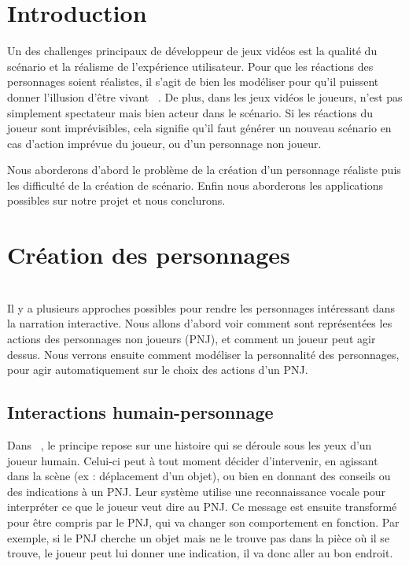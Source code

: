 \documentclass[asi]{picINSA}
\begin{document}
    
    \couverture{}

\tableofcontents{}

\chapter*{Introduction}

Un des challenges principaux de développeur de jeux vidéos est la qualité du scénario et la réalisme de l'expérience utilisateur.
Pour que les réactions des personnages soient réalistes, il s'agit de bien les modéliser pour
qu'il puissent donner l'illusion d'être vivant ~\cite{Bates94therole}. De plus, dans les jeux vidéos le joueurs,
n'est pas simplement spectateur mais bien acteur dans le scénario. Si les réactions du joueur sont imprévisibles,
cela signifie qu'il faut générer un nouveau scénario en cas d'action imprévue du joueur, ou d'un personnage non joueur.

Nous aborderons d'abord le problème de la création d'un personnage réaliste puis les difficulté de la création de scénario.
Enfin nous aborderons les applications possibles sur notre projet et nous conclurons.

\chapter{Création des personnages}
~\\
Il y a plusieurs approches possibles pour rendre les personnages intéressant dans la narration interactive. Nous allons d'abord voir comment sont représentées les actions des personnages non joueurs (PNJ), et comment un joueur peut agir dessus. Nous verrons ensuite comment modéliser la personnalité des personnages, pour agir automatiquement sur le choix des actions d'un PNJ.\\


\section{Interactions humain-personnage}

Dans ~\cite{IRIS:conf/aamas/CavazzaCM2002}, le principe repose sur une histoire qui se déroule sous les yeux d'un joueur humain. Celui-ci peut à tout moment décider d'intervenir, en agissant dans la scène (ex : déplacement d'un objet), ou bien en donnant des conseils ou des indications à un PNJ. Leur système utilise une reconnaissance vocale pour interpréter ce que le joueur veut dire au PNJ. Ce message est ensuite transformé pour être compris par le PNJ, qui va changer son comportement en fonction. Par exemple, si le PNJ cherche un objet mais ne le trouve pas dans la pièce où il se trouve, le joueur peut lui donner une indication, il va donc aller au bon endroit.\\
\end{document}
